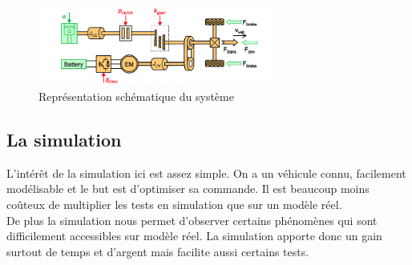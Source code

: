 \begin{figure}[ht]
	\begin{center}
	\includegraphics[width=0.7\textwidth]{images/Systeme_VEH.png}
	\caption{Représentation schématique du système}\label{img:Schéma système VEH}
	\end{center}
\end{figure}
\FloatBarrier 

\subsection{La simulation}		
L'intérêt de la simulation ici est assez simple. On a un véhicule connu, facilement modélisable et le but est d'optimiser sa commande. Il est beaucoup moins coûteux de multiplier les tests en simulation que sur un modèle réel.\\
De plus la simulation nous permet d'observer certains phénomènes qui sont difficilement accessibles sur modèle réel. La simulation apporte donc un gain surtout de temps et d'argent mais facilite aussi certains tests.
